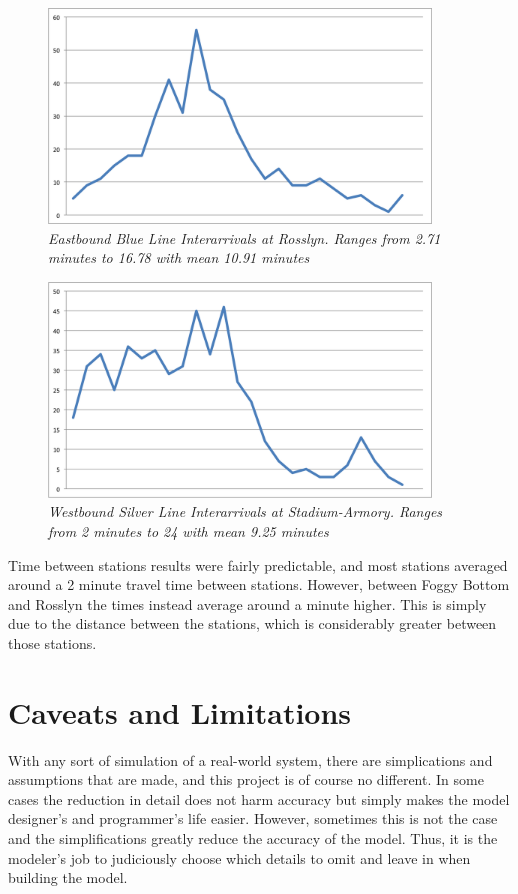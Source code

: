 \documentclass[a4paper,12pt]{article}
\begin{document}
\begin{figure}
\begin{center}
\includegraphics[width=4in]{../images/train_interarrivals/eastbound_blue_interarrivals.png}
\caption{\small \sl Eastbound Blue Line Interarrivals at Rosslyn. Ranges from 2.71 minutes to 16.78 with mean 10.91 minutes \label{fig:eastboundblueinterarrivals}}
\end{center}
\end{figure}

\begin{figure}
\begin{center}
\includegraphics[width=4in]{../images/train_interarrivals/westbound_silver_interarrivals.png}
\caption{\small \sl Westbound Silver Line Interarrivals at Stadium-Armory. Ranges from 2 minutes to 24 with mean 9.25 minutes \label{fig:westboundsilverinterarrivals}}
\end{center}
\end{figure}

Time between stations results were fairly predictable, and most stations averaged around a 2 minute travel time between
stations. However, between Foggy Bottom and Rosslyn the times instead average around a minute higher. This is simply
due to the distance between the stations, which is considerably greater between those stations.

\section{Caveats and Limitations}
With any sort of simulation of a real-world system, there are simplications and assumptions that are made, and this project is of course no
different. In some cases the reduction in detail does not harm accuracy but simply makes the model designer's and
programmer's life easier. However, sometimes this is not the case and the simplifications greatly reduce the accuracy
of the model. Thus, it is the modeler's job to judiciously choose which details to omit and leave in when building the
model.
\end{document}
